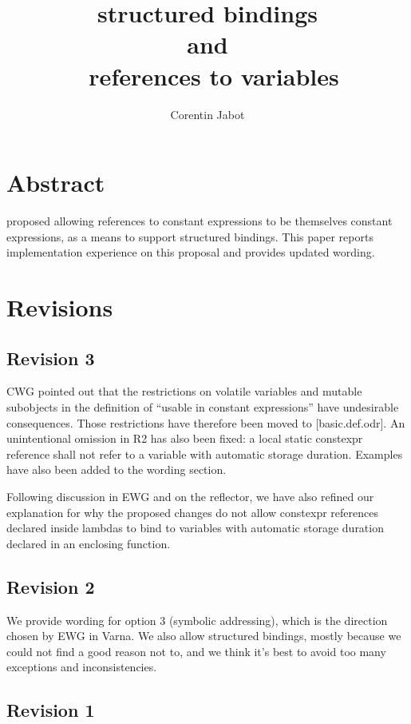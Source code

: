\documentclass{wg21}
\title{\tcode{constexpr} structured bindings\\{\small and}\\\ references to \tcode{constexpr} variables}
\author{Corentin Jabot}{corentin.jabot@gmail.com}
\begin{document}
\maketitle

\section{Abstract}

 proposed allowing references to constant expressions to be themselves constant expressions,
as a means to support  structured bindings.
This paper reports implementation experience on this proposal and provides updated wording.


\section{Revisions}

\subsection{Revision 3}

CWG pointed out that the restrictions on volatile variables and mutable subobjects in the definition of ``usable in constant expressions'' have undesirable consequences. Those restrictions have therefore been moved to [basic.def.odr]. An unintentional omission in R2 has also been fixed: a local static constexpr reference shall not refer to a variable with automatic storage duration. Examples have also been added to the wording section.

Following discussion in EWG and on the reflector, we have also refined our explanation for why the proposed changes do not allow constexpr references declared inside lambdas to bind to variables with automatic storage duration declared in an enclosing function.

\subsection{Revision 2}

We provide wording for option 3 (symbolic addressing), which is the direction chosen by EWG in Varna.
We also allow  structured bindings, mostly because we could not find a good reason not to,
and we think it's best to avoid too many exceptions and inconsistencies.

\subsection{Revision 1}
\end{document}
